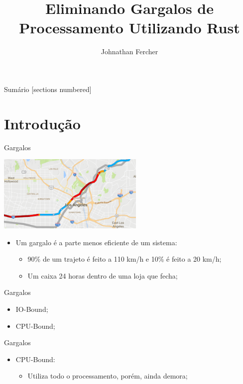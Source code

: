 \documentclass[aspectratio=169]{beamer}
\title{Eliminando Gargalos de Processamento \newline Utilizando Rust}
\date{}
\author{Johnathan Fercher}
\begin{document}
\maketitle

\begin{frame}{Sumário}
  [sections numbered]
  \tableofcontents[hideallsubsections]
\end{frame}

\section{Introdução}
\begin{frame}{Gargalos}	
	\begin{center}
		\includegraphics[width=7cm]{imgs/bottleneck}
	\end{center}
	\begin{itemize}
		\item Um gargalo é a parte menos eficiente de um sistema:
		\begin{itemize}
			\item 90\% de um trajeto é feito a 110 km/h e 10\% é feito a 20 km/h;
			\item Um caixa 24 horas dentro de uma loja que fecha;
		\end{itemize}
	\end{itemize}		
\end{frame}

\begin{frame}{Gargalos}	
	\begin{itemize}
		\item IO-Bound;
		\item CPU-Bound;
	\end{itemize}	
\end{frame}

\begin{frame}[noframenumbering]{Gargalos}	
	\begin{itemize}
		\item CPU-Bound:
		\begin{itemize}
			\item Utiliza todo o processamento, porém, ainda demora;
		\end{itemize}
	\end{itemize}	
\end{frame}
\end{document}
